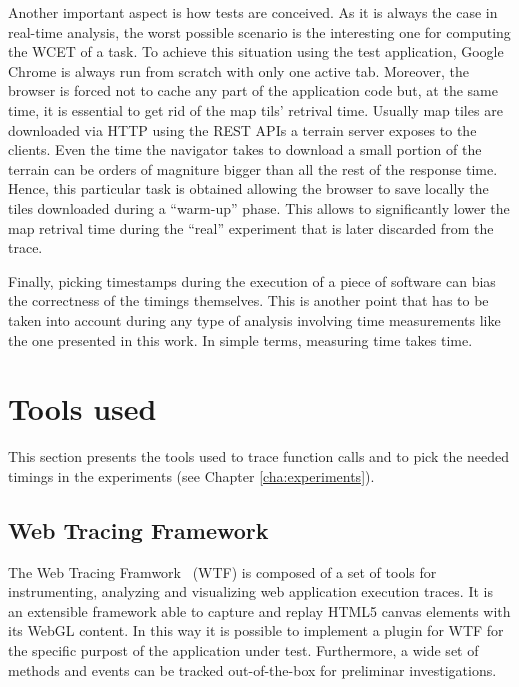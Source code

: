 Another important aspect is how tests are conceived. As it is always the case in
real-time analysis, the worst possible scenario is the interesting one for
computing the WCET of a task. To achieve this situation using the test application,
Google Chrome is always run from scratch with only one active tab. Moreover, the browser
is forced not to cache any part of the application code but, at the same time, it
is essential to get rid of the map tils' retrival time. Usually map tiles are
downloaded via HTTP using the REST APIs a terrain server exposes to the clients.
Even the time the navigator takes to download a small portion of the terrain
can be orders of magniture bigger than all the rest of the response time.
Hence, this particular task is obtained allowing the browser to save locally the
tiles downloaded during a ``warm-up'' phase. This allows to significantly lower
the map retrival time during the ``real'' experiment that is later discarded from
the trace.

Finally, picking timestamps during the execution of a piece of software can bias
the correctness of the timings themselves. This is another point that has to be
taken into account during any type of analysis involving time measurements like
the one presented in this work. In simple terms, measuring time takes time.


\section{Tools used}
This section presents the tools used to trace function calls and to pick the needed
timings in the experiments (see Chapter \ref{cha:experiments}).

\subsection{Web Tracing Framework}
The Web Tracing Framwork~\cite{wtf} (WTF) is composed of a set of tools for
instrumenting, analyzing and visualizing web application execution traces.
It is an extensible framework able to capture and replay HTML5 canvas elements
with its WebGL content. In this way it is possible to implement a plugin for WTF
for the specific purpost of the application under test. Furthermore, a wide set
of methods and events can be tracked out-of-the-box for preliminar investigations.

